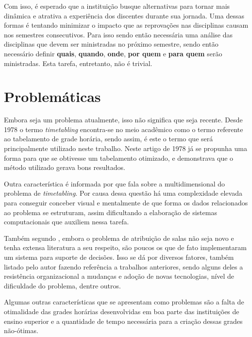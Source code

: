 Com isso, é esperado que a instituição busque alternativas para tornar mais dinâmica e atrativa a experiência dos discentes durante sua jornada. Uma dessas formas é tentando minimizar o impacto que as reprovações nas disciplinas causam nos semestres consecutivos. Para isso sendo então necessária uma análise das disciplinas que devem ser ministradas no próximo semestre, sendo então necessário definir \textbf{quais}, \textbf{quando}, \textbf{onde}, \textbf{por quem} e \textbf{para quem} serão ministradas. Esta tarefa, entretanto, não é trivial.

\section{Problemáticas} %

Embora seja um problema atualmente, isso não significa que seja recente. Desde 1978 \cite{BARHAM1978} o termo \textit{timetabling} encontra-se no meio acadêmico como o termo referente ao tabelamento de grade horária, sendo assim, é este o termo que será principalmente utilizado neste trabalho. Neste artigo de 1978 já se propunha uma forma para que se obtivesse um tabelamento otimizado, e demonstrava que o método utilizado gerava bons resultados.

Outra característica é informada por  que fala sobre a multidimensional do problema de \textit{timetabling}. Por causa dessa questão há uma complexidade elevada para conseguir conceber visual e mentalmente de que forma os dados relacionados ao problema se estruturam, assim dificultando a elaboração de sistemas computacionais que auxiliem nessa tarefa.

Também segundo , embora o problema de atribuição de salas não seja novo e tenha extensa literatura a seu respeito, são poucos os que de fato implementaram um sistema para suporte de decisões. Isso se dá por diversos fatores, também listado pelo autor fazendo referência a trabalhos anteriores, sendo alguns deles a resistência organizacional a mudanças e adoção de novas tecnologias, nível de dificuldade do problema, dentre outros.


Algumas outras características que se apresentam como problemas são a falta de otimalidade das grades horárias desenvolvidas em boa parte das instituições de ensino superior e a quantidade de tempo necessária para a criação dessas grades não-ótimas.

